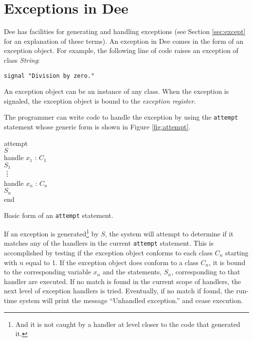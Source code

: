 \section{Exceptions in Dee}
\label{sec:exceptions}

Dee has facilities for generating and handling exceptions (see Section
\ref{sec:except} for an explanation of these terms).  An exception in
Dee comes in the form of an exception object.  For example, the
following line of code raises an exception of class {\em String}:

\vspace{3mm}
{\tt signal "Division by zero."}
\vspace{3mm}

An exception object can be an instance of any class.  When the
exception is signaled, the exception object is bound to the {\em
exception register}.  

The programmer can write code to handle the exception by using the
{\tt attempt} statement whose generic form is shown in Figure
\ref{fig:attempt}.

\begin{shortfigure}
\begin{prog}
\>      attempt                      \\
\>\>      $S$                        \\
\>      handle  $x_{1}$ : $C_{1}$    \\
\>\>      $S_{1}$                    \\
\>      \vdots                       \\
\>      handle $x_{n}$ : $C_{n}$     \\
\>\>      $S_{n}$                    \\
\>      end                          
\end{prog}
\caption{Basic form of an {\tt attempt} statement.}
\label{fig:attempt}
\end{shortfigure}

If an exception is generated\footnote{And it is not caught by a
handler at level closer to the code that generated it.} by $S$, the
system will attempt to determine if it matches any of the handlers in
the current {\tt attempt} statement.  This is accomplished by testing
if the exception object conforms to each class $C_{n}$ starting with
$n$ equal to 1.  If the exception object does conform to a class
$C_{n}$, it is bound to the corresponding variable $x_{n}$ and the
statements, $S_{n}$, corresponding to that handler are executed.  If
no match is found in the current scope of handlers, the next level of
exception handlers is tried.  Eventually, if no match if found, the
run-time system will print the message ``Unhandled exception.'' and
cease execution.


